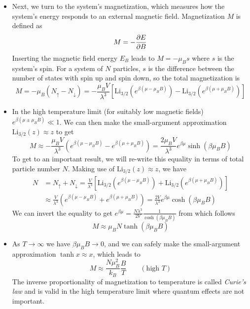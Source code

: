 \documentclass[11pt, a4paper]{article}
\begin{document}
\begin{itemize}
	\item Next, we turn to the system's magnetization, which measures how the system's energy responds to an external magnetic field. Magnetization $ M $ is defined as
	\begin{equation*}
		M = - \pdv{E}{B}
	\end{equation*}
	Inserting the magnetic field energy $ E_{B} $ leads to $ M = - \mu_{B}s $ where $ s $ is the system's spin. For a system of $ N $ particles, $ s $ is the difference between the number of states with spin up and spin down, so the total magnetization is
	\begin{equation*}
		M = - \mu_{B}(N_{\uparrow} - N_{\downarrow}) = - \frac{\mu_{B}V}{\lambda^{3}} \left[\mathrm{Li}_{3/2}\left (e^{\beta(\mu - \mu_{B}B)}\right ) - \mathrm{Li}_{3/2}\left (e^{\beta(\mu + \mu_{B}B)}\right )\right]
	\end{equation*}
	 
	\item In the high temperature limit (for suitably low magnetic fields) $ e^{\beta(\mu \pm \mu_{B}B)} \ll 1$. We can then make the small-argument approximation $ \mathrm{Li}_{3/2}(z) \approx z $ to get
	\begin{equation*}
		M \approx - \frac{\mu_{B}V}{\lambda^{3}} \left(e^{\beta(\mu - \mu_{B}B)} - e^{\beta(\mu + \mu_{B}B)}\right) =  \frac{2\mu_{B}V}{\lambda^{3}}e^{\beta \mu} \sinh(\beta \mu_{B}B)
	\end{equation*}
	To get to an important result, we will re-write this equality in terms of total particle number $ N $. Making use of $ \mathrm{Li}_{3/2}(z) \approx z $, we have
	\begin{align*}
		N &= N_{\uparrow} + N_{\downarrow} = \frac{V}{\lambda^{3}}\left[\mathrm{Li}_{3/2}\left (e^{\beta(\mu - \mu_{B}B)}\right ) + \mathrm{Li}_{3/2}\left (e^{\beta(\mu + \mu_{B}B)}\right )\right]\\
		&\approx \frac{V}{\lambda^{3}}\left(e^{\beta(\mu - \mu_{B}B)} + e^{\beta(\mu + \mu_{B}B)} \right) = \frac{2V}{\lambda^{3}}e^{\beta \mu} \cosh(\beta\mu_{B}B)
	\end{align*}
	We can invert the equality to get $ e^{\beta \mu} = \frac{N\lambda^{3}}{2V} \frac{1}{\cosh(\beta\mu_{B}B)} $ from which follows
	\begin{equation*}
		M \approx \mu_{B} N \tanh(\beta\mu_{B}B)
	\end{equation*}
	
	\item As $ T \to \infty $ we have $ \beta \mu_{B}B \to 0 $, and we can safely make the small-argument approximation $ \tanh x \approx x $, which leads to
	\begin{equation*}
		M \approx \frac{N\mu_{B}^{2}}{k_{B}} \frac{B}{T} \qquad (\text{high } T)
	\end{equation*}
	The inverse proportionality of magnetization to temperature is called \textit{Curie's law} and is valid in the high temperature limit where quantum effects are not important. 
	

\end{itemize}
\end{document}
